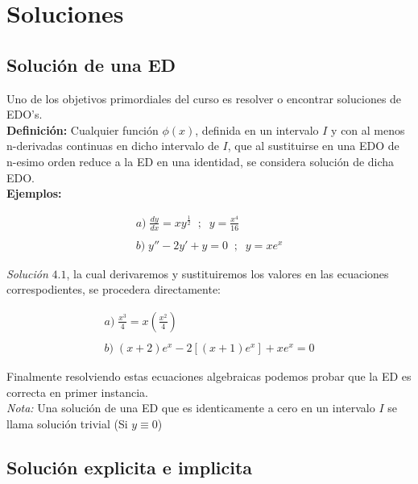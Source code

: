 \chapter{Soluciones}

\section{Solución de una ED}

Uno de los objetivos primordiales del curso es resolver o encontrar soluciones de EDO's.\\

\textbf{Definición:} Cualquier función \(\displaystyle\phi(x)\), definida en un intervalo \(\displaystyle I \) y con al menos n-derivadas continuas en dicho intervalo de \(\displaystyle I\), que al sustituirse en una EDO de n-esimo orden reduce a la ED en una identidad, se considera solución de dicha EDO.\\

\textbf{Ejemplos:}

\begin{equation}
    \begin{gathered}
        a)\;\frac{dy}{dx}=xy^{\frac{1}{2}}\;\;;\;\;y=\frac{x^{4}}{16}\\\\
        b)\;y''-2y'+y=0\;\;;\;\;y=xe^{x}
    \end{gathered}
\end{equation}

\textit{Solución} \(\displaystyle 4.1\), la cual derivaremos y sustituiremos los valores en las ecuaciones correspodientes, se procedera directamente:

\begin{equation*}
    \begin{gathered}
        a)\;\frac{x^{3}}{4}=x\left(\frac{x^{2}}{4}\right)\\\\
        b)\; (x+2)e^{x}-2[(x+1)e^{x}]+xe^{x}=0
    \end{gathered}
\end{equation*}

Finalmente resolviendo estas ecuaciones algebraicas podemos probar que la ED es correcta en primer instancia.\\

\textit{Nota:} Una solución de una ED que es identicamente a cero en un intervalo \(\displaystyle I\) se llama solución trivial (Si \(\displaystyle y\equiv0\))

\section{Solución explicita e implicita}

